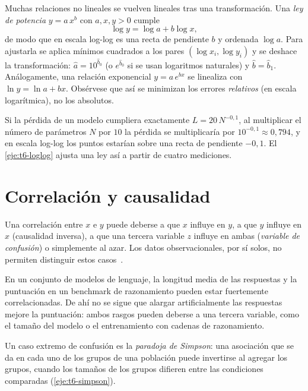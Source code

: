 Muchas relaciones no lineales se vuelven lineales tras una transformación. Una \emph{ley de potencia} $y=a\,x^{b}$ con $a,x,y>0$ cumple
\[
\log y=\log a+b\log x,
\]
de modo que en escala log-log es una recta de pendiente $b$ y ordenada $\log a$. Para ajustarla se aplica mínimos cuadrados a los pares $(\log x_i,\log y_i)$ y se deshace la transformación: $\widehat a=10^{\widehat b_0}$ (o $e^{\widehat b_0}$ si se usan logaritmos naturales) y $\widehat b=\widehat b_1$. Análogamente, una relación exponencial $y=a\,e^{bx}$ se linealiza con $\ln y=\ln a+bx$. Obsérvese que así se minimizan los errores \emph{relativos} (en escala logarítmica), no los absolutos.

\begin{ejemplo}\label{ej:t6-potencia}
Si la pérdida de un modelo cumpliera exactamente $L=20\,N^{-0{,}1}$, al multiplicar el número de parámetros $N$ por $10$ la pérdida se multiplicaría por $10^{-0{,}1}\approx0{,}794$, y en escala log-log los puntos estarían sobre una recta de pendiente $-0{,}1$. El \cref{eje:t6-loglog} ajusta una ley así a partir de cuatro mediciones.
\end{ejemplo}

\section{Correlación y causalidad}

Una correlación entre $x$ e $y$ puede deberse a que $x$ influye en $y$, a que $y$ influye en $x$ (causalidad inversa), a que una tercera variable $z$ influye en ambas (\emph{variable de confusión}) o simplemente al azar. Los datos observacionales, por sí solos, no permiten distinguir estos casos~\cite[cap.~16]{wasserman}.

\begin{ejemplo}\label{ej:t6-confusion}
En un conjunto de modelos de lenguaje, la longitud media de las respuestas y la puntuación en un benchmark de razonamiento pueden estar fuertemente correlacionadas. De ahí no se sigue que alargar artificialmente las respuestas mejore la puntuación: ambos rasgos pueden deberse a una tercera variable, como el tamaño del modelo o el entrenamiento con cadenas de razonamiento.
\end{ejemplo}

Un caso extremo de confusión es la \emph{paradoja de Simpson}: una asociación que se da en cada uno de los grupos de una población puede invertirse al agregar los grupos, cuando los tamaños de los grupos difieren entre las condiciones comparadas (\cref{eje:t6-simpson}).

